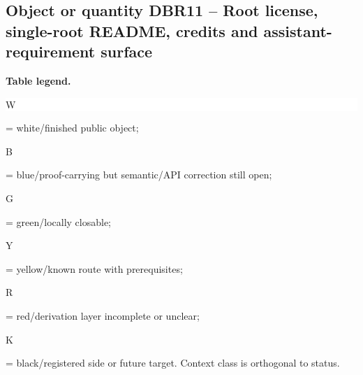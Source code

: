 \subsection*{Object or quantity DBR11 -- Root license, single-root README, credits and assistant-requirement surface}
\hypertarget{objproof:DBR11}{}
\par\smallskip\noindent\begin{minipage}{0.99\linewidth}\footnotesize\raggedright\textbf{Table legend.} \colorbox{white}{\strut W} = white/finished public object; \colorbox{cyan!20}{\strut B} = blue/proof-carrying but semantic/API correction still open; \colorbox{green!18}{\strut G} = green/locally closable; \colorbox{yellow!25}{\strut Y} = yellow/known route with prerequisites; \colorbox{red!20}{\strut R} = red/derivation layer incomplete or unclear; \colorbox{black!18}{\strut K} = black/registered side or future target. Context class is orthogonal to status.\end{minipage}\par\vspace{0.25em}
